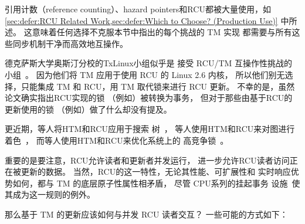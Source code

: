 引用计数（reference counting）、hazard pointers和RCU都被大量使用，如
\cref{sec:defer:RCU Related Work,sec:defer:Which to Choose? (Production Use)}
中所述。
这意味着任何选择不克服本节中指出的每个挑战的 TM 实现
都需要与所有这些同步机制干净而高效地互操作。

德克萨斯大学奥斯汀分校的TxLinux小组似乎是
接受 RCU/TM 互操作性挑战的
小组~\cite{ChistopherJRossbach2007a}。
因为他们将 TM 应用于使用 RCU 的 Linux 2.6 内核，
所以他们别无选择，只能集成 TM 和 RCU，用 TM 取代锁来进行 RCU 更新。
不幸的是，虽然论文确实指出RCU实现的锁
（例如）被转换为事务，
但对于那些由基于RCU的更新使用的锁
（例如）做了什么却没有提及。

更近期，等人将HTM和RCU应用于搜索
树~\cite{Siakavaras2017CombiningHA,DimitriosSiakavaras2020RCU-HTM-B+Trees}，
等人使用HTM和RCU来对图进行
着色~\cite{ChristinaGiannoula2018HTM-RCU-graphcoloring}，
而等人使用HTM和RCU来优化系统上的
高竞争锁~\cite{SeongJaePark2020HTMRCUlock}。

重要的是要注意，RCU允许读者和更新者并发运行，
进一步允许RCU读者访问正在被更新的数据。
当然，RCU的这一特性，无论其性能、可扩展性和
实时响应优势如何，都与 TM 的底层原子性属性相矛盾，
尽管 CPU系列的挂起事务
设施~\cite{Le:2015:TMS:3266491.3266500}使其成为这一规则的例外。

那么基于 TM 的更新应该如何与并发 RCU 读者交互？
一些可能的方式如下：

